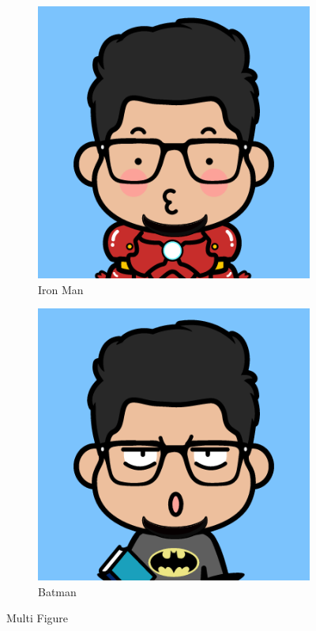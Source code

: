 \documentclass{article}
\begin{document}
    \begin{figure}[h!]
        \centering
        \begin{subfigure}[h!]{0.4\linewidth}
            \includegraphics[width=\linewidth]{B.png}
            \caption{Iron Man}
        \end{subfigure}
        \begin{subfigure}[h!]{0.4\linewidth}
            \includegraphics[width=\linewidth]{C.png}
            \caption{Batman}
        \end{subfigure}
        \caption{Multi Figure}
        \label{fig:multi2}
    \end{figure}
\end{document}
